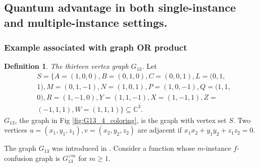 \documentclass[journal, onecolumn, draftcls]{IEEEtran}
\theoremstyle{definition}
\newtheorem{definition}{Definition}
\newcommand{\bbC}{\mathbb{C}}
\newcommand{\meng}[1]{\marginpar{+}{\bf Ruoyu's remark}: {\em #1}}
\begin{document}
 


\subsection{Quantum advantage in both single-instance and multiple-instance settings.}
\subsubsection{Example associated with graph OR product\label{subsubsec:G13}}
\begin{definition}{\it The thirteen vertex graph $G_{13}$.} 
\label{defn:G_thirteen}
    Let 
    \begin{align*}
    &S = \{A = (1,0,0), B = (0,1,0), C = (0,0,1), L = (0,1,\\&1), M = (0,1,-1), N = (1,0,1), P = (1,0,-1), Q = (1,1,\\&0), R = (1,-1,0), Y = (1,1,-1),X = (1,-1,1),
    Z = \\&(-1,1,1),W = (1,1,1)\}\subseteq \bbC^3. 
    \end{align*}
      $G_{13}$, the graph in Fig  \ref{fig:G13_4_coloring}, is the graph with vertex set $S$. Two vertices $u=(x_1,y_1,z_1),v=(x_2,y_2,z_2)$ are adjacent if $x_1x_2+y_1y_2+z_1z_2=0.$
\end{definition}
The graph $G_{13}$ was introduced in \cite{YuO12}.
Consider a function whose $m$-instance $f$-confusion graph is $G_{13}^{\lor m}$ for $m\ge 1$.
\end{document}
